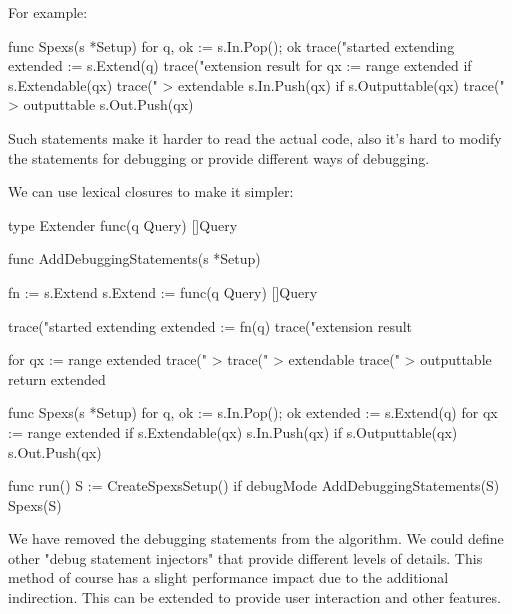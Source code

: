 For example:

\begin{file}
func Spexs(s *Setup) {
    for q, ok := s.In.Pop(); ok {
        trace("started extending %
        extended := s.Extend(q)
        trace("extension result %
        for qx := range extended {
            if s.Extendable(qx) {
                trace(" > extendable %
                s.In.Push(qx)
            }
            if s.Outputtable(qx) {
                trace(" > outputtable %
                s.Out.Push(qx)
            }
        }
    }
}
\end{file}

Such statements make it harder to read the actual code, also it's hard to modify the statements for debugging or provide different ways of debugging.

We can use lexical closures to make it simpler:

\begin{file}
type Extender func(q Query) []Query

func AddDebuggingStatements(s *Setup) {
    fn := s.Extend
    s.Extend := func(q Query) []Query {
        trace("started extending %
        extended := fn(q)
        trace("extension result %
        
        for qx := range extended {
            trace(" > %
            trace(" > extendable %
            trace(" > outputtable %
        }
        return extended
    }
}

func Spexs(s *Setup) {
    for q, ok := s.In.Pop(); ok {
        extended := s.Extend(q)
        for qx := range extended {
            if s.Extendable(qx) {
                s.In.Push(qx)
                if s.Outputtable(qx) {
                    s.Out.Push(qx)
                }
            }
        }
    }
}

func run(){
    S := CreateSpexsSetup()
    if debugMode {
        AddDebuggingStatements(S)
    }
    Spexs(S)
}
\end{file}

We have removed the debugging statements from the algorithm. We could define other "debug statement injectors" that provide different levels of details. This method of course has a slight performance impact due to the additional indirection. This can be extended to provide user interaction and other features.